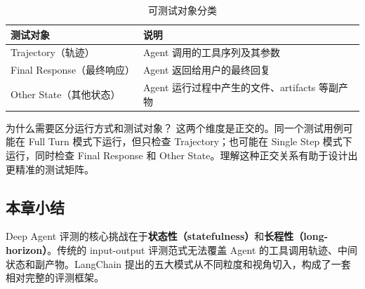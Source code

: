 \begin{table}[H]
\centering
\caption{可测试对象分类}
\begin{tabular}{lp{10cm}}
\toprule
\textbf{测试对象} & \textbf{说明} \\
\midrule
Trajectory（轨迹） & Agent 调用的工具序列及其参数 \\
Final Response（最终响应） & Agent 返回给用户的最终回复 \\
Other State（其他状态） & Agent 运行过程中产生的文件、artifacts 等副产物 \\
\bottomrule
\end{tabular}
\end{table}

\begin{knowledgebox}{为什么需要区分运行方式和测试对象？}
这两个维度是正交的。同一个测试用例可能在 Full Turn 模式下运行，但只检查 Trajectory；也可能在 Single Step 模式下运行，同时检查 Final Response 和 Other State。理解这种正交关系有助于设计出更精准的测试矩阵。
\end{knowledgebox}

\subsection{本章小结}

Deep Agent 评测的核心挑战在于\textbf{状态性（statefulness）}和\textbf{长程性（long-horizon）}。传统的 input-output 评测范式无法覆盖 Agent 的工具调用轨迹、中间状态和副产物。LangChain 提出的五大模式从不同粒度和视角切入，构成了一套相对完整的评测框架。


